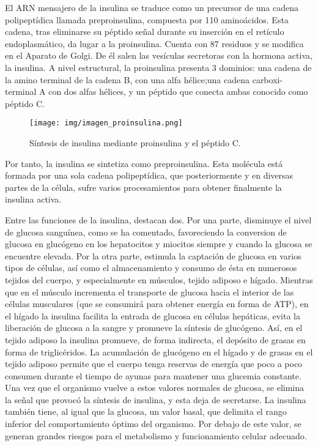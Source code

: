 El ARN mensajero de la insulina se traduce como un precursor de una cadena polipeptídica llamada preproinsulina, compuesta por 110 aminoácidos. Esta cadena, tras eliminarse su péptido señal durante su inserción en el retículo endoplasmático, da lugar a la proinsulina. Cuenta con 87 residuos y se modifica en el Aparato de Golgi. De él salen las vesículas secretoras con la hormona activa, la insulina.
A nivel estructural, la proinsulina presenta 3 dominios: una cadena de la amino terminal de la cadena B, con una alfa hélice;una cadena carboxi- terminal A con dos alfas hélices, y un péptido que conecta ambas conocido como péptido C.


\begin{figure}[h]
    \centering
    \texttt{[image: img/imagen\_proinsulina.png]}
    \caption{Síntesis de insulina mediante proinsulina y el péptido C.}
    \label{fig:proinsulina}
\end{figure}

Por tanto, la insulina se sintetiza como preproinsulina. Esta molécula está formada por una sola cadena polipeptídica, que posteriormente y en diversas partes de la célula, sufre varios procesamientos para obtener finalmente la insulina activa.

Entre las funciones de la insulina, destacan dos. Por una parte, disminuye el nivel de glucosa sanguínea, como se ha comentado, favoreciendo la conversion de glucosa en glucógeno en los hepatocitos y miocitos siempre y cuando la glucosa se encuentre elevada. Por la otra parte, estimula la captación de glucosa en varios tipos de células, así como el almacenamiento y consumo de ésta en numerosos tejidos del cuerpo, y especialmente en músculos, tejido adiposo e hígado. Mientras que en el músculo incrementa el transporte de glucosa hacia el interior de las células musculares (que se consumirá para obtener energía en forma de ATP), en el hígado la insulina facilita la entrada de glucosa en células hepáticas, evita la liberación de glucosa a la sangre y promueve la síntesis de glucógeno. Así, en el tejido adiposo la insulina promueve, de forma indirecta, el depósito de grasas en forma de triglicéridos.
La acumulación de glucógeno en el hígado y de grasas en el tejido adiposo permite que el cuerpo tenga reservas de energía que poco a poco consumen durante el tiempo de ayunas para mantener una glucemia constante. Una vez que el organismo vuelve a estos valores normales de glucosa, se elimina la señal que provocó la síntesis de insulina, y esta deja de secretarse. La insulina también tiene, al igual que la glucosa, un valor basal, que delimita el rango inferior del comportamiento óptimo del organismo. Por debajo de este valor, se generan grandes riesgos para el metabolismo y funcionamiento celular adecuado.

